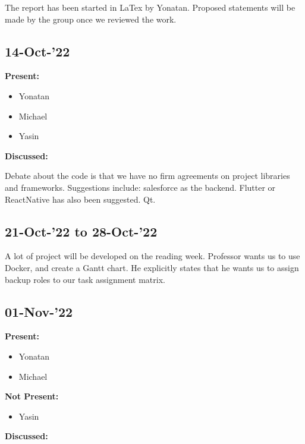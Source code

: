 \documentclass[11pt]{article}
\begin{document}
    The report has been started in LaTex by Yonatan.
    Proposed statements will be made by the group once we reviewed the work.

    \subsection{14-Oct-’22}

    \textbf{Present:}
    \begin{itemize}
        \item Yonatan
        \item Michael
        \item Yasin
    \end{itemize}

    \textbf{Discussed:}

    Debate about the code is that we have no firm agreements on project libraries and frameworks.
    Suggestions include: salesforce as the backend.
    Flutter or ReactNative has also been suggested.
    Qt.

    \subsection{21-Oct-’22 to 28-Oct-’22}\label{subsec:21-oct-22-to-28-oct-22}


    A lot of project will be developed on the reading week.
    Professor wants us to use Docker, and create a Gantt chart.
    He explicitly states that he wants us to assign backup roles to our task assignment matrix.

    \subsection{01-Nov-’22}\label{subsec:01-nov-22}

    \textbf{Present:}
    \begin{itemize}
        \item Yonatan
        \item Michael
    \end{itemize}

    \textbf{Not Present:}

    \begin{itemize}
        \item Yasin
    \end{itemize}

    \textbf{Discussed:}
\end{document}
